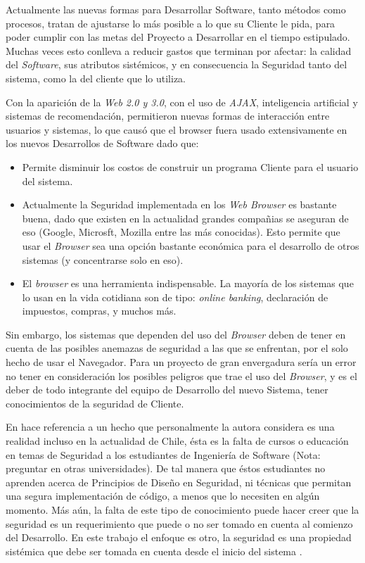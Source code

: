 Actualmente las nuevas formas para Desarrollar Software, tanto métodos como procesos, tratan de ajustarse lo más posible a lo que su Cliente le pida, para poder cumplir con las metas del Proyecto a Desarrollar en el tiempo estipulado. Muchas veces esto conlleva a reducir gastos que terminan por afectar: la calidad del \textit{Software}, sus atributos sistémicos, y en consecuencia la Seguridad tanto del sistema, como la del cliente que lo utiliza.

Con la aparición de la \textit{Web 2.0 y 3.0}, con el uso de \textit{AJAX}, inteligencia artificial y sistemas de recomendación, permitieron nuevas formas de interacción entre usuarios y sistemas, lo que causó que el browser fuera usado extensivamente en los nuevos Desarrollos de Software dado que:
\begin{itemize}
	\item Permite disminuir los costos de construir un programa Cliente para el usuario del sistema.
	\item Actualmente la Seguridad implementada en los \textit{Web Browser} es bastante buena, dado que existen en la actualidad grandes compañias se aseguran de eso (Google, Microsft, Mozilla entre las más conocidas). Esto permite que usar el \textit{Browser} sea una opción bastante económica para el desarrollo de otros sistemas (y concentrarse solo en eso).
	\item El \textit{browser} es una herramienta indispensable. La mayoría de los sistemas que lo usan en la vida cotidiana son de tipo: \textit{online banking}, declaración de impuestos, compras, y muchos más.
\end{itemize}

Sin embargo, los sistemas que dependen del uso del \textit{Browser} deben de tener en cuenta de las posibles anemazas de seguridad a las que se enfrentan, por el solo hecho de usar el Navegador.  Para un proyecto de gran envergadura sería un error no tener en consideración los posibles peligros que trae el uso del \textit{Browser}, y es el deber de todo integrante del equipo de Desarrollo del nuevo Sistema, tener conocimientos de la seguridad de Cliente.

En \cite{goertzel2007software} hace referencia a un hecho que personalmente la autora considera es una realidad incluso en la actualidad de Chile, ésta es la falta de cursos o educación en temas de Seguridad a los estudiantes de Ingeniería de Software (Nota: preguntar en otras universidades). De tal manera que éstos estudiantes no aprenden acerca de Principios de Diseño en Seguridad, ni técnicas que permitan una segura implementación de código, a menos que lo necesiten en algún momento. Más aún, la falta de este tipo de conocimiento puede hacer creer que la seguridad es un requerimiento que puede o no ser tomado en cuenta al comienzo del Desarrollo. En este trabajo el enfoque es otro, la seguridad es una propiedad sistémica que debe ser tomada en cuenta desde el inicio del sistema \cite{braz2008eliciting, fernandez2013security}.

